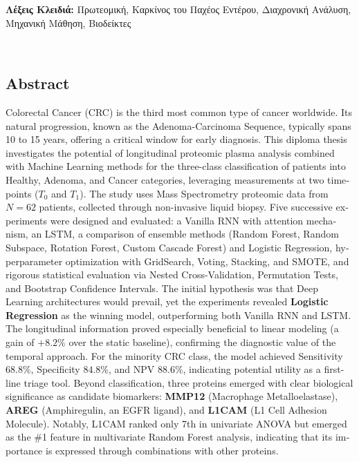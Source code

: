 \documentclass[12pt, a4paper]{article}
\begin{document}
\vspace{4cm}
\noindent\textbf{Λέξεις Κλειδιά:} Πρωτεομική, Καρκίνος του Παχέος Εντέρου, Διαχρονική Ανάλυση, Μηχανική Μάθηση, Βιοδείκτες

\clearpage
\thispagestyle{empty}
~
\clearpage

\thispagestyle{plain} 
\begin{english}
\justifying %
\section*{Abstract}


 Colorectal Cancer (CRC) is the third most common type of cancer worldwide. Its natural progression, known as the Adenoma-Carcinoma Sequence, typically spans 10 to 15 years, offering a critical window for early diagnosis. This diploma thesis investigates the potential of longitudinal proteomic plasma analysis combined with Machine Learning methods for the three-class classification of patients into Healthy, Adenoma, and Cancer categories, leveraging measurements at two timepoints ($T_0$ and $T_1$). The study uses Mass Spectrometry proteomic data from $N = 62$ patients, collected through non-invasive liquid biopsy. Five successive experiments were designed and evaluated: a Vanilla RNN with attention mechanism, an LSTM, a comparison of ensemble methods (Random Forest, Random Subspace, Rotation Forest, Custom Cascade Forest) and Logistic Regression, hyperparameter optimization with GridSearch, Voting, Stacking, and SMOTE, and rigorous statistical evaluation via Nested Cross-Validation, Permutation Tests, and Bootstrap Confidence Intervals. The initial hypothesis was that Deep Learning architectures would prevail, yet the experiments revealed \textbf{Logistic Regression }as the winning model, outperforming both Vanilla RNN and LSTM. The longitudinal information proved especially beneficial to linear modeling (a gain of $+8.2\%$ over the static baseline), confirming the diagnostic value of the temporal approach. For the minority CRC class, the model achieved Sensitivity $68.8\%$, Specificity $84.8\%$, and NPV $88.6\%$, indicating potential utility as a first-line triage tool. Beyond classification, three proteins emerged with clear biological significance as candidate biomarkers: \textbf{MMP12} (Macrophage Metalloelastase), \textbf{AREG} (Amphiregulin, an EGFR ligand), and \textbf{L1CAM} (L1 Cell Adhesion Molecule). Notably, L1CAM ranked only 7th in univariate ANOVA but emerged as the \#1 feature in multivariate Random Forest analysis, indicating that its importance is expressed through combinations with other proteins.


\end{english}
\end{document}
